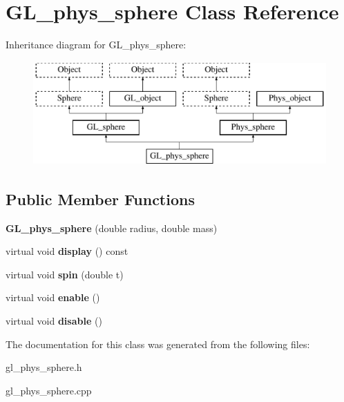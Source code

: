 \hypertarget{class_g_l__phys__sphere}{
\section{GL\_\-phys\_\-sphere Class Reference}
\label{class_g_l__phys__sphere}
}
Inheritance diagram for GL\_\-phys\_\-sphere:\begin{figure}[H]
\begin{center}
\leavevmode
\includegraphics[height=4.000000cm]{class_g_l__phys__sphere}
\end{center}
\end{figure}
\subsection*{Public Member Functions}
\begin{DoxyCompactItemize}
\item 
\hypertarget{class_g_l__phys__sphere_a5f57b09034032da4ff40a232b1a26803}{
{\bfseries GL\_\-phys\_\-sphere} (double radius, double mass)}
\label{class_g_l__phys__sphere_a5f57b09034032da4ff40a232b1a26803}

\item 
\hypertarget{class_g_l__phys__sphere_a1cd329b25aa163da76b33c3e5fefc168}{
virtual void {\bfseries display} () const }
\label{class_g_l__phys__sphere_a1cd329b25aa163da76b33c3e5fefc168}

\item 
\hypertarget{class_g_l__phys__sphere_aa38dafd3f1eed09a70baa644e4ecbb99}{
virtual void {\bfseries spin} (double t)}
\label{class_g_l__phys__sphere_aa38dafd3f1eed09a70baa644e4ecbb99}

\item 
\hypertarget{class_g_l__phys__sphere_a9a1ef8733bc7c037de7501a57776d340}{
virtual void {\bfseries enable} ()}
\label{class_g_l__phys__sphere_a9a1ef8733bc7c037de7501a57776d340}

\item 
\hypertarget{class_g_l__phys__sphere_a499dfe8689b6fbf24877b197d9b70e3d}{
virtual void {\bfseries disable} ()}
\label{class_g_l__phys__sphere_a499dfe8689b6fbf24877b197d9b70e3d}

\end{DoxyCompactItemize}


The documentation for this class was generated from the following files:\begin{DoxyCompactItemize}
\item 
gl\_\-phys\_\-sphere.h\item 
gl\_\-phys\_\-sphere.cpp\end{DoxyCompactItemize}
